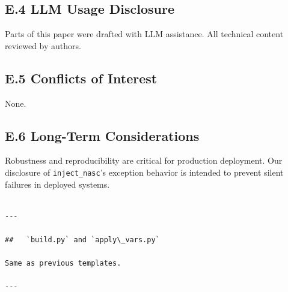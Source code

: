 \subsection{E.4 LLM Usage Disclosure}

Parts of this paper were drafted with LLM assistance. All technical content 
reviewed by authors.

\subsection{E.5 Conflicts of Interest}

None.

\subsection{E.6 Long-Term Considerations}

Robustness and reproducibility are critical for production deployment. 
Our disclosure of \texttt{inject\_nasc}'s exception behavior is intended to 
prevent silent failures in deployed systems.
\begin{lstlisting}

---

##   `build.py` and `apply\_vars.py`

Same as previous templates.

---
\end{lstlisting}